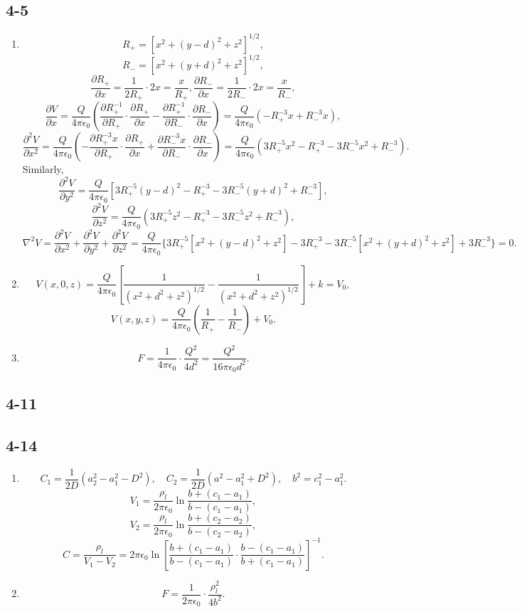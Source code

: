 \documentclass[6pt,a4paper]{article}
\begin{document}
\subsection{4-5}
\begin{enumerate}[label=\alph*)]
\item
$$R_+=[x^2+(y-d)^2+z^2]^{1/2},$$
$$R_-=[x^2+(y+d)^2+z^2]^{1/2},$$
$$\frac{\partial R_+}{\partial x}=\frac{1}{2R_+}\cdot2x=\frac{x}{R_+},\frac{\partial R_-}{\partial x}=\frac{1}{2R_-}\cdot2x=\frac{x}{R_-},$$
$$\frac{\partial V}{\partial x}=\frac{Q}{4\pi\epsilon_0}\left(\frac{\partial R_+^{-1}}{\partial R_+}\cdot\frac{\partial R_+}{\partial x}-\frac{\partial R_+^{-1}}{\partial R_-}\cdot\frac{\partial R_-}{\partial x}\right)=\frac{Q}{4\pi\epsilon_0}(-R_+^{-3}x+R_-^{-3}x),$$
$$\frac{\partial^2 V}{\partial x^2}=\frac{Q}{4\pi\epsilon_0}\left(-\frac{\partial R_+^{-3}x}{\partial R_+}\cdot\frac{\partial R_+}{\partial x}+\frac{\partial R_-^{-3}x}{\partial R_-}\cdot\frac{\partial R_-}{\partial x}\right)=\frac{Q}{4\pi\epsilon_0}(3R_+^{-5}x^2-R_+^{-3}-3R_-^{-5}x^2+R_-^{-3}).$$
Similarly,
$$\frac{\partial^2 V}{\partial y^2}=\frac{Q}{4\pi\epsilon_0}[3R_+^{-5}(y-d)^2-R_+^{-3}-3R_-^{-5}(y+d)^2+R_-^{-3}],$$
$$\frac{\partial^2 V}{\partial z^2}=\frac{Q}{4\pi\epsilon_0}(3R_+^{-5}z^2-R_+^{-3}-3R_-^{-5}z^2+R_-^{-3}),$$
$$\nabla^2 V=\frac{\partial^2 V}{\partial x^2}+\frac{\partial^2 V}{\partial y^2}+\frac{\partial^2 V}{\partial z^2}=\frac{Q}{4\pi\epsilon_0}\{3R_+^{-5}[x^2+(y-d)^2+z^2]-3R_+^{-3}-3R_-^{-5}[x^2+(y+d)^2+z^2]+3R_-^{-3}\}=0.$$
\item
$$V(x,0,z)=\frac{Q}{4\pi\epsilon_0}\left[\frac{1}{(x^2+d^2+z^2)^{1/2}}-\frac{1}{(x^2+d^2+z^2)^{1/2}}\right]+k=V_0,$$
$$V(x,y,z)=\frac{Q}{4\pi\epsilon_0}\left(\frac{1}{R_+}-\frac{1}{R_-}\right)+V_0.$$
\item
$$F=\frac{1}{4\pi\epsilon_0}\cdot\frac{Q^2}{4d^2}=\frac{Q^2}{16\pi\epsilon_0d^2}.$$
\end{enumerate}

\subsection{4-11}

\subsection{4-14}
\begin{enumerate}[label=\alph*)]
\item
$$C_1=\frac{1}{2D}(a_2^2-a_1^2-D^2),\quad C_2=\frac{1}{2D}(a^2-a_1^2+D^2),\quad b^2=c_1^2-a_1^2.$$
$$V_1=\frac{\rho_l}{2\pi\epsilon_0}\ln\frac{b+(c_1-a_1)}{b-(c_1-a_1)},$$
$$V_2=\frac{\rho_l}{2\pi\epsilon_0}\ln\frac{b+(c_2-a_2)}{b-(c_2-a_2)},$$
$$C=\frac{\rho_l}{V_1-V_2}=2\pi\epsilon_0\ln\left[\frac{b+(c_1-a_1)}{b-(c_1-a_1)}\cdot\frac{b-(c_1-a_1)}{b+(c_1-a_1)}\right]^{-1}.$$
\item
$$F=\frac{1}{2\pi\epsilon_0}\cdot\frac{\rho_l^2}{4b^2}.$$
\end{enumerate}
\end{document}
